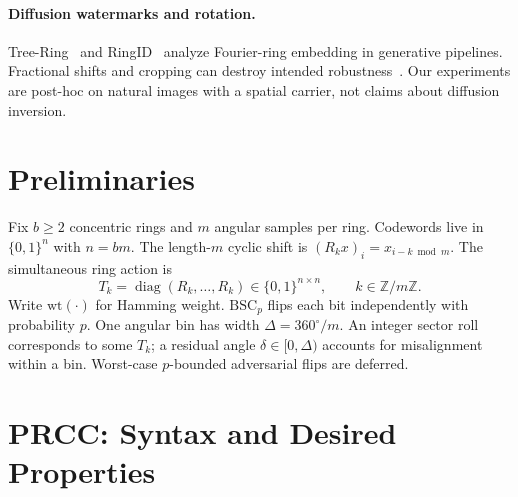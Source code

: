 \documentclass[11pt,a4paper]{article}
\newcommand{\wt}{\mathrm{wt}}
\newcommand{\BSC}{\mathrm{BSC}}
\begin{document}
\paragraph{Diffusion watermarks and rotation.}
Tree-Ring~\cite{wen2023treering} and RingID~\cite{ci2024ringid} analyze Fourier-ring
embedding in generative pipelines.
Fractional shifts and cropping can destroy intended robustness~\cite{ci2024ringid}.
Our experiments are post-hoc on natural images with a spatial carrier, not
claims about diffusion inversion.

\section{Preliminaries}
\label{sec:prelim}

Fix \(b\ge 2\) concentric rings and \(m\) angular samples per ring.
Codewords live in \(\{0,1\}^n\) with \(n=bm\).
The length-\(m\) cyclic shift is \((R_k x)_i=x_{i-k\bmod m}\).
The simultaneous ring action is
\[
T_k=\operatorname{diag}(R_k,\ldots,R_k)\in\{0,1\}^{n\times n},\qquad k\in\mathbb{Z}/m\mathbb{Z}.
\]
Write \(\wt(\cdot)\) for Hamming weight.
\(\BSC_p\) flips each bit independently with probability \(p\).
One angular bin has width \(\Delta=360^\circ/m\).
An integer sector roll corresponds to some \(T_k\); a residual angle
\(\delta\in[0,\Delta)\) accounts for misalignment within a bin.
Worst-case \(p\)-bounded adversarial flips are deferred.

\section{PRCC: Syntax and Desired Properties}
\label{sec:prcc}
\end{document}
